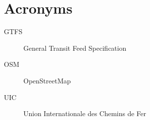 \chapter*{Acronyms}
\begin{description}
    \item[GTFS] General Transit Feed Specification
    \item[OSM] OpenStreetMap
    \item[UIC] Union Internationale des Chemins de Fer
\end{description}
